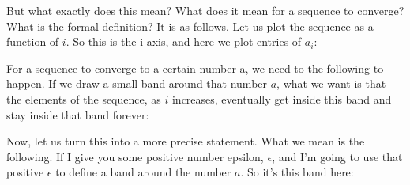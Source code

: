 \documentclass[pdftex, brazil, 12pt, twoside]{article}
\begin{document}
But what exactly does this mean?
What does it mean for a sequence to converge?
What is the formal definition?
It is as follows.
Let us plot the sequence as a function of $i$.
So this is the i-axis, and here we plot entries of $a_i$:

\begin{figure}[H]
  \begin{center}
  \end{center}
\end{figure}

For a sequence to converge to a certain number a, we need to
the following to happen.
If we draw a small band around that number $a$, what we want is
that the elements of the sequence, as $i$ increases,
eventually get inside this band and stay
inside that band forever:

\begin{figure}[H]
  \begin{center}
  \end{center}
\end{figure}

Now, let us turn this into a more precise statement.
What we mean is the following.
If I give you some positive number epsilon, $\epsilon$, and I'm going
to use that positive $\epsilon$ to define a band
around the number $a$. So it's this band here:

\begin{figure}[H]
  \begin{center}
  \end{center}
\end{figure}
\end{document}
